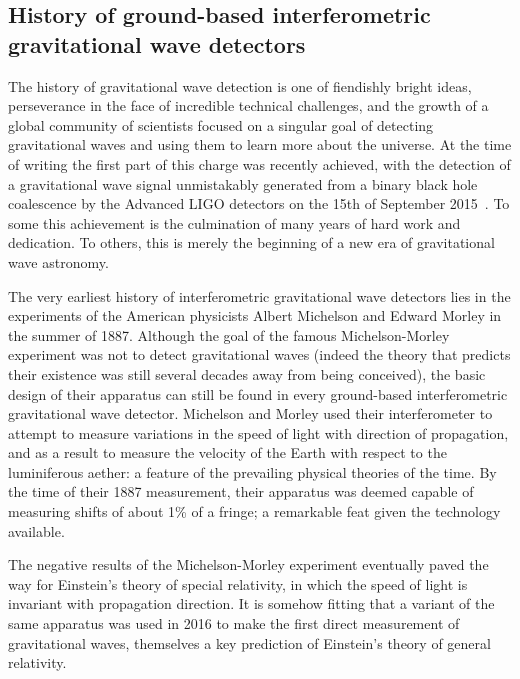 \newpage
\subsection{History of ground-based interferometric gravitational wave detectors}\label{subsec:prehistory}
The history of gravitational wave detection is one of fiendishly bright ideas, perseverance in the face of incredible 
technical challenges, and the growth of a global community of scientists focused on a singular goal of detecting 
gravitational waves and using them to learn more about the universe. At the time of writing the first part of this 
charge was recently achieved, with the detection of a gravitational wave signal unmistakably generated from a binary 
black hole coalescence by the Advanced LIGO detectors on the 15th of September 2015~\cite{GW150914}. To 
some this achievement is the culmination of many years of hard work and dedication. To others, this is merely 
the beginning of a new era of gravitational wave astronomy. 

The very earliest history of interferometric gravitational wave detectors lies in the experiments 
of the American physicists Albert Michelson and Edward Morley in the summer of 1887. Although 
the goal of the famous Michelson-Morley experiment was not to detect gravitational waves (indeed 
the theory that predicts their existence was still several decades away from being conceived), the basic 
design of their apparatus can still be found in every ground-based interferometric gravitational wave detector. 
Michelson and Morley used their interferometer to attempt to measure variations in the speed of 
light with direction of propagation, and as a result to measure the velocity of the Earth with respect to the 
luminiferous aether: a feature of the prevailing physical theories of the time. By the time of their 1887 measurement, 
their apparatus was deemed capable of measuring shifts of about 1\% of a fringe; a remarkable feat given the 
technology available. 

The negative results of the Michelson-Morley experiment eventually paved the way for Einstein's theory of special 
relativity, in which the speed of light is invariant with propagation direction. It is somehow fitting that a variant 
of the same apparatus was used in 2016 to make the first direct measurement of gravitational waves, themselves 
a key prediction of Einstein's theory of general relativity. 

